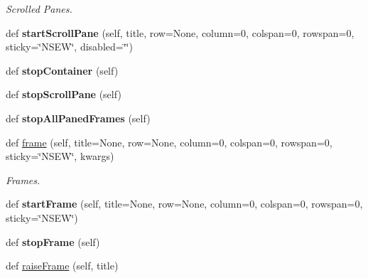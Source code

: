 \begin{DoxyCompactItemize}
\begin{DoxyCompactList}\small\item\em Scrolled Panes. \end{DoxyCompactList}\item 
\mbox{\label{classappjar_1_1gui_ad735ca0edaee04f5de3e32c2547abc89}} 
def {\bfseries start\+Scroll\+Pane} (self, title, row=None, column=0, colspan=0, rowspan=0, sticky=\char`\"{}N\+S\+EW\char`\"{}, disabled=\char`\"{}\char`\"{})
\item 
\mbox{\label{classappjar_1_1gui_ab0d2009cf6ee59ac6119eaabe51efc96}} 
def {\bfseries stop\+Container} (self)
\item 
\mbox{\label{classappjar_1_1gui_a67dda8c3de217c838f2c0617e2be5f20}} 
def {\bfseries stop\+Scroll\+Pane} (self)
\item 
\mbox{\label{classappjar_1_1gui_a232bd2cac7eb64048575e11915c0c9f9}} 
def {\bfseries stop\+All\+Paned\+Frames} (self)
\item 
\mbox{\label{classappjar_1_1gui_ab6f683871cc4f4adfd41d3bb12d22096}} 
def \hyperlink{classappjar_1_1gui_ab6f683871cc4f4adfd41d3bb12d22096}{frame} (self, title=None, row=None, column=0, colspan=0, rowspan=0, sticky=\char`\"{}N\+S\+EW\char`\"{}, kwargs)
\begin{DoxyCompactList}\small\item\em Frames. \end{DoxyCompactList}\item 
\mbox{\label{classappjar_1_1gui_aca86de0fc5cb78406b4a63816f52e2b4}} 
def {\bfseries start\+Frame} (self, title=None, row=None, column=0, colspan=0, rowspan=0, sticky=\char`\"{}N\+S\+EW\char`\"{})
\item 
\mbox{\label{classappjar_1_1gui_a9cac30fbcb6ae304bc587bca86b2b874}} 
def {\bfseries stop\+Frame} (self)
\item 
def \hyperlink{classappjar_1_1gui_a887e02904802ffaec260acbb8b8b894a}{raise\+Frame} (self, title)
\item 
\mbox{\label{classappjar_1_1gui_aa7d26d744e9dd74c0696c9cecb4dd002}} 

\end{DoxyCompactItemize}
